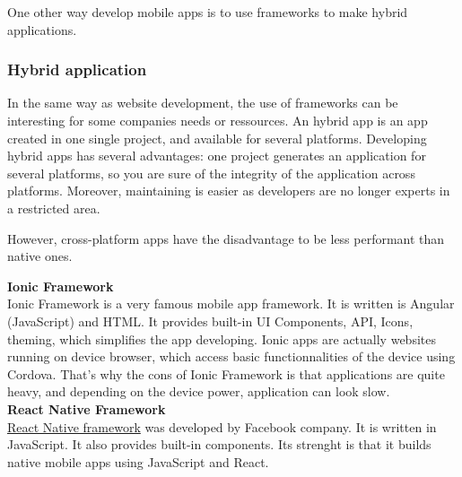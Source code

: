 \documentclass{article}
\begin{document}
                        One other way develop mobile apps is to use frameworks to make hybrid applications.

                    \subsubsection{Hybrid application}
                        In the same way as website development, the use of frameworks can be interesting for some companies needs or ressources.
                        An hybrid app is an app created in one single project, and available for several platforms.
                        Developing hybrid apps has several advantages: one project generates an application for several platforms, so you 
                        are sure of the integrity of the application across platforms. Moreover, maintaining is easier as developers are no longer
                        experts in a restricted area.

                        However, cross-platform apps have the disadvantage to be less performant than native ones.

                        \textbf{Ionic Framework}\\
                        Ionic Framework is a very famous mobile app framework. It is written is Angular (JavaScript) and HTML. It provides
                        built-in UI Components, API, Icons, theming, which simplifies the app developing. Ionic apps are actually websites
                        running on device browser, which access basic functionnalities of the device using Cordova.
                        That's why the cons of Ionic Framework is that applications are quite heavy, and depending on the device power,
                        application can look slow.\\

                        \textbf{React Native Framework}\\
                        \href{https://facebook.github.io/react-native/}{React Native framework} was developed by Facebook company. 
                        It is written in JavaScript. It also provides built-in components. Its strenght is that it builds native
                        mobile apps using JavaScript and React.



                    
\end{document}
